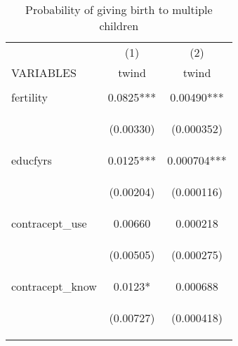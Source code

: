 \documentclass{article}[11pt,subeqn]
\begin{document}
\begin{spacing}{1.25}
\begin{table}[ht]
\caption{Probability of giving birth to multiple children}
\label{tab:twinreg1}
\begin{center}
\begin{tabular}{lcc} \toprule
  & (1) & (2) \\
 VARIABLES & twind & twind \\ \midrule
 \begin{footnotesize}\end{footnotesize} & \begin{footnotesize}\end{footnotesize} & \begin{footnotesize}\end{footnotesize} \\
 fertility & 0.0825*** & 0.00490*** \\
  \begin{footnotesize}\end{footnotesize} & \begin{footnotesize}(0.00330)\end{footnotesize} & \begin{footnotesize}(0.000352)\end{footnotesize} \\
  educfyrs & 0.0125*** & 0.000704*** \\
  \begin{footnotesize}\end{footnotesize} & \begin{footnotesize}(0.00204)\end{footnotesize} & \begin{footnotesize}(0.000116)\end{footnotesize} \\
  contracept\_use & 0.00660 & 0.000218 \\
  \begin{footnotesize}\end{footnotesize} & \begin{footnotesize}(0.00505)\end{footnotesize} & \begin{footnotesize}(0.000275)\end{footnotesize} \\
  contracept\_know & 0.0123* & 0.000688 \\
  \begin{footnotesize}\end{footnotesize} & \begin{footnotesize}(0.00727)\end{footnotesize} & \begin{footnotesize}(0.000418)\end{footnotesize} \\

\end{tabular}
\end{center}
\end{table}
\end{spacing}
\end{document}
